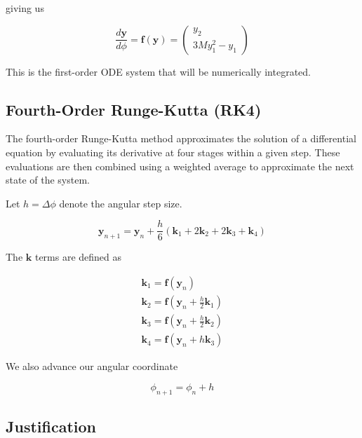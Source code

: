 \documentclass[12pt]{article}
\numberwithin{equation}{section}
\begin{document}
giving us

\begin{equation}
    \frac{d\mathbf{y}}{d\phi}
    =
    \mathbf{f}(\mathbf{y})
    =
    \begin{pmatrix}
        y_2 \\
        3My_1^2 - y_1
    \end{pmatrix}
\end{equation}

This is the first-order ODE system that will be 
numerically integrated.

\subsection{Fourth-Order Runge-Kutta (RK4)}

The fourth-order Runge-Kutta method approximates the 
solution of a differential equation by evaluating its 
derivative at four stages within a given step. These 
evaluations are then combined using a weighted average 
to approximate the next state of the system.

Let $h = \Delta\phi$ denote the angular step size.

\begin{equation}
    \mathbf{y}_{n+1} =
    \mathbf{y}_n +
    \frac{h}{6}
    (\mathbf{k}_1 + 2\mathbf{k}_2 +
    2\mathbf{k}_3 + \mathbf{k}_4)
\end{equation}

The $\mathbf{k}$ terms are defined as

\begin{gather}
    \mathbf{k}_1 =
    \mathbf{f}(\mathbf{y}_n) \\
    \mathbf{k}_2 =
    \mathbf{f}\left(
        \mathbf{y}_n + \frac{h}{2}\mathbf{k}_1
    \right) \\
    \mathbf{k}_3 =
    \mathbf{f}\left(
        \mathbf{y}_n + \frac{h}{2}\mathbf{k}_2
    \right) \\
    \mathbf{k}_4 =
    \mathbf{f}\left(
        \mathbf{y}_n + h\mathbf{k}_3
    \right)
\end{gather}

We also advance our angular coordinate

\begin{equation}
    \phi_{n+1} = \phi_n + h
\end{equation}

\subsection{Justification}
\end{document}

